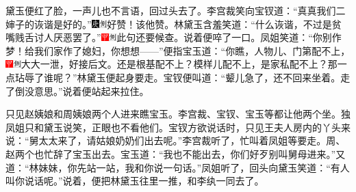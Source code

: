 黛玉便红了脸，一声儿也不言语，回过头去了。李宫裁笑向宝钗道：``真真我们二婶子的诙谐是好的。''{\includegraphics[width=3mm]{../Images/00004}\includegraphics[width=3mm]{../Images/00011}\footnotesize \kaishu 好赞！该他赞。}林黛玉含羞笑道：``什么诙谐，不过是贫嘴贱舌讨人厌恶罢了。''{\includegraphics[width=3mm]{../Images/00002}\includegraphics[width=3mm]{../Images/00011}\footnotesize \kaishu 此句还要候查。}说着便啐了一口。凤姐笑道：``你别作梦！给我们家作了媳妇，你想想------''便指宝玉道：``你瞧，人物儿、门第配不上，{\includegraphics[width=3mm]{../Images/00002}\includegraphics[width=3mm]{../Images/00011}\footnotesize \kaishu 大大一泄，好接后文。}还是根基配不上？模样儿配不上，是家私配不上？那一点玷辱了谁呢？''林黛玉便起身要走。宝钗便叫道：``颦儿急了，还不回来坐着。走了倒没意思。''说着便站起来拉住。

只见赵姨娘和周姨娘两个人进来瞧宝玉。李宫裁、宝钗、宝玉等都让他两个坐。独凤姐只和黛玉说笑，正眼也不看他们。宝钗方欲说话时，只见王夫人房内的丫头来说：``舅太太来了，请姑娘奶奶们出去呢。''李宫裁听了，忙叫着凤姐等要走。周、赵两个也忙辞了宝玉出去。宝玉道：``我也不能出去，你们好歹别叫舅母进来。''又道：``林妹妹，你先站一站，我和你说一句话。''凤姐听了，回头向黛玉笑道：``有人叫你说话呢。''说着，便把林黛玉往里一推，和李纨一同去了。

